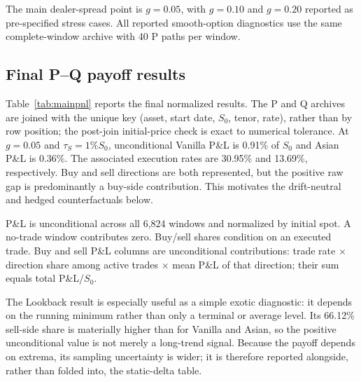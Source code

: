 ﻿\documentclass[12pt,letterpaper]{article}
\newcommand{\tabnote}[1]{\begin{minipage}{\linewidth}\vspace{4pt}\footnotesize\singlespacing #1\end{minipage}}
\begin{document}
The main dealer-spread point is $g=0.05$, with $g=0.10$ and $g=0.20$ reported
as pre-specified stress cases. All reported smooth-option diagnostics use the
same complete-window archive with 40 P paths per window.

\subsection{Final P--Q payoff results}

Table~\ref{tab:mainpnl} reports the final normalized results. The P and Q
archives are joined with the unique key (asset, start date, $S_0$, tenor,
rate), rather than by row position; the post-join initial-price check is exact
to numerical tolerance. At $g=0.05$ and $\tau_S=1\%S_0$, unconditional Vanilla
P\&L is 0.91\% of $S_0$ and Asian P\&L is 0.36\%. The associated execution
rates are 30.95\% and 13.69\%, respectively. Buy and sell directions are both
represented, but the positive raw gap is predominantly a buy-side contribution.
This motivates the drift-neutral and hedged counterfactuals below.

\begin{table}[ht]
\singlespacing
\centering
\caption{Final P--Q payoff diagnostic at $g=0.05$ and $\tau_S=1\%S_0$}
\label{tab:mainpnl}
\tabnote{P\&L is unconditional across all 6{,}824 windows and normalized by
initial spot. A no-trade window contributes zero. Buy/sell shares condition on
an executed trade. Buy and sell P\&L columns are unconditional contributions:
trade rate $\times$ direction share among active trades $\times$ mean P\&L of
that direction; their sum equals total P\&L/$S_0$.}
\end{table}

The Lookback result is especially useful as a simple exotic diagnostic: it
depends on the running minimum rather than only a terminal or average level.
Its 66.12\% sell-side share is materially higher than for Vanilla and Asian,
so the positive unconditional value is not merely a long-trend signal. Because
the payoff depends on extrema, its sampling uncertainty is wider; it is
therefore reported alongside, rather than folded into, the static-delta table.
\end{document}
